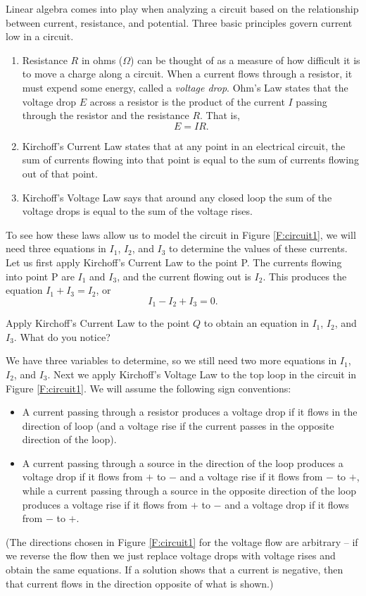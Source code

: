 Linear algebra comes into play when analyzing a circuit based on the relationship between current, resistance, and potential. Three basic principles govern current low in a circuit.
\begin{enumerate}
\item Resistance $R$ in ohms ($\Omega$) can be thought of as a measure of how difficult it is to move a charge along a circuit. When a current flows through a resistor, it must expend some energy, called a \emph{voltage drop}. Ohm's Law states that the voltage drop $E$ across a resistor is the product of the current $I$ passing through the resistor and the resistance $R$. That is,
\[E = IR.\]
\item Kirchoff's Current Law states that at any point in an electrical circuit, the sum of currents flowing into that point is equal to the sum of currents flowing out of that point.
\item Kirchoff's Voltage Law says that around any closed loop the sum of the voltage drops is equal to the sum of the voltage rises. 
\end{enumerate} 

To see how these laws allow us to model the circuit in Figure \ref{F:circuit1}, we will need three equations in $I_1$, $I_2$, and $I_3$ to determine the values of these currents. Let us first apply Kirchoff's Current Law to the point P. The currents flowing into point P are $I_1$ and $I_3$, and the current flowing out is $I_2$. This produces the equation $I_1+I_3 = I_2$, or 
\[I_1 - I_2 + I_3 = 0.\]

\begin{pactivity} Apply Kirchoff's Current Law to the point $Q$ to obtain an equation in $I_1$, $I_2$, and $I_3$. What do you notice?
\end{pactivity}

We have three variables to determine, so we still need two more equations in $I_1$, $I_2$, and $I_3$. Next we apply Kirchoff's Voltage Law to the top loop in the circuit in Figure \ref{F:circuit1}. We will assume the following sign conventions:
\begin{itemize}
\item A current passing through a resistor produces a voltage drop if it flows in the direction of loop (and a voltage rise if the current passes in the opposite direction of the loop). 
\item A current passing through a source in the direction of the loop produces a voltage drop if it flows from $+$ to $-$ and a voltage rise if it flows from $-$ to $+$, while a current passing through a source in the opposite direction of the loop produces a voltage rise if it flows from $+$ to $-$ and a voltage drop if it flows from $-$ to $+$. 
\end{itemize}
(The directions chosen in Figure \ref{F:circuit1} for the voltage flow are arbitrary -- if we reverse the flow then we just replace voltage drops with voltage rises and obtain the same equations. If a solution shows that a current is negative, then that current flows in the direction opposite of what is shown.) 

